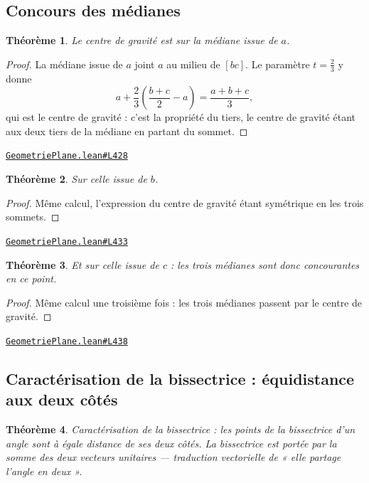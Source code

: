 \documentclass[11pt,a4paper]{article}
\theoremstyle{definition}
\theoremstyle{plain}
\newtheorem{theoreme}{Théorème}
\newcommand{\source}[2]{\par\smallskip\noindent\hfill{\footnotesize\href{#1}{\texttt{#2}}}\par\smallskip}
\begin{document}
\subsection{Concours des médianes}

\begin{theoreme}
Le centre de gravité est sur la médiane issue de $a$.
\end{theoreme}

\begin{proof}
La médiane issue de $a$ joint $a$ au milieu de $[bc]$. Le paramètre $t = \tfrac23$ y
donne
\[ a + \frac{2}{3}\left(\frac{b+c}{2} - a\right) = \frac{a+b+c}{3} , \]
qui est le centre de gravité : c'est la propriété du tiers, le centre de gravité étant aux
deux tiers de la médiane en partant du sommet.
\end{proof}
\source{https://github.com/Commutator-IO/learn-lean/blob/main/courses/01-college/02-geometrie-plane/GeometriePlane.lean\#L428}{GeometriePlane.lean\#L428}

\begin{theoreme}
Sur celle issue de $b$.
\end{theoreme}

\begin{proof}
Même calcul, l'expression du centre de gravité étant symétrique en les trois sommets.
\end{proof}
\source{https://github.com/Commutator-IO/learn-lean/blob/main/courses/01-college/02-geometrie-plane/GeometriePlane.lean\#L433}{GeometriePlane.lean\#L433}

\begin{theoreme}
Et sur celle issue de $c$ : les trois médianes sont donc concourantes en ce point.
\end{theoreme}

\begin{proof}
Même calcul une troisième fois : les trois médianes passent par le centre de gravité.
\end{proof}
\source{https://github.com/Commutator-IO/learn-lean/blob/main/courses/01-college/02-geometrie-plane/GeometriePlane.lean\#L438}{GeometriePlane.lean\#L438}

\subsection{Caractérisation de la bissectrice : équidistance aux deux côtés}

\begin{theoreme}
Caractérisation de la bissectrice : les points de la bissectrice d'un angle sont à
égale distance de ses deux côtés. La bissectrice est portée par la somme des deux vecteurs
unitaires — traduction vectorielle de « elle partage l'angle en deux ».
\end{theoreme}
\end{document}
